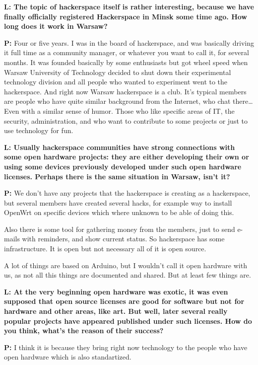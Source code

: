 \documentclass[10pt, a5paper]{article}
\begin{document}
\begin{Parallel}[p]{}{}
{{\noindent \bf L: The topic of hackerspace itself is rather interesting, because we have finally officially registered Hackerspace in Minsk some time ago. How long does it work in Warsaw?}

{\noindent \bf P:} Four or five years. I was in the board of hackerspace, and was basically driving it full time as a community manager, or whatever you want to call it, for several months. It was founded basically by some enthusiasts but got wheel speed when Warsaw University of Technology decided to shut down their experimental technology division and all people who wanted to experiment went to the hackerspace. And right now Warsaw hackerspace is a club. It’s typical members are people who have quite similar background from the Internet, who chat there… Even with a similar sense of humor. Those who like specific areas of IT, the security, administration, and who want to contribute to some projects or just to use technology for fun.

{\noindent \bf L: Usually hackerspace communities have strong connections with some open hardware projects: they are either developing their own or using some devices previously developed under such open hardware licenses. Perhaps there is the same situation in Warsaw, isn’t it?}

{\noindent \bf P:} We don’t have any projects that the hackerspace is creating as a hackerspace, but several members have created several hacks, for example way to install OpenWrt on specific devices which where unknown to be able of doing this.

Also there is some tool for gathering money from the members, just to send e-mails with reminders, and show current status. So hackerspace has some infrastructure. It is open but not necessary all of it is open source. 
 
A lot of things are based on Arduino, but I wouldn’t call it open hardware with us, as not all this things are documented and shared. But at least few things are.

{\noindent \bf L: At the very beginning open hardware was exotic, it was even supposed that open source licenses are good for software but not for hardware and other areas, like art. But well, later several really popular projects have appeared published under such licenses. How do you think, what's the reason of their success?}

{\noindent \bf P:} I think it is because they bring right now technology to the people who have open hardware which is also standartized.

}
\end{Parallel}
\end{document}
